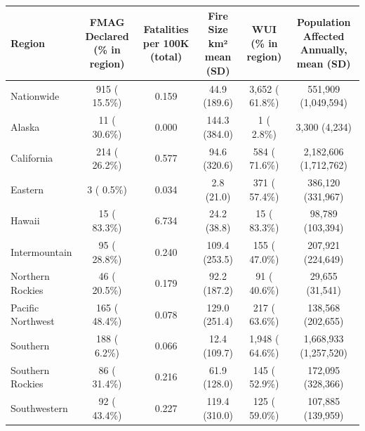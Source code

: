 \begin{table}
\fontsize{6.0pt}{7.2pt}\selectfont
\begin{tabular*}{\linewidth}{@{\extracolsep{\fill}}lccccc}
\toprule
Region & FMAG Declared (\% in region) & Fatalities per 100K
(total) & Fire Size km²
mean (SD) & WUI
(\% in region) & Population Affected Annually, mean (SD) \\ 
\midrule\addlinespace[2.5pt]
Nationwide &   915 ( 15.5\%) &    0.159 & 44.9 (189.6) & 3,652 ( 61.8\%) & 551,909 (1,049,594) \\ 
Alaska &    11 ( 30.6\%) &    0.000 & 144.3 (384.0) &     1 (  2.8\%) & 3,300 (4,234) \\ 
California &   214 ( 26.2\%) &    0.577 & 94.6 (320.6) &   584 ( 71.6\%) & 2,182,606 (1,712,762) \\ 
Eastern &     3 (  0.5\%) &    0.034 & 2.8 (21.0) &   371 ( 57.4\%) & 386,120 (331,967) \\ 
Hawaii &    15 ( 83.3\%) &    6.734 & 24.2 (38.8) &    15 ( 83.3\%) & 98,789 (103,394) \\ 
Intermountain &    95 ( 28.8\%) &    0.240 & 109.4 (253.5) &   155 ( 47.0\%) & 207,921 (224,649) \\ 
Northern Rockies &    46 ( 20.5\%) &    0.179 & 92.2 (187.2) &    91 ( 40.6\%) & 29,655 (31,541) \\ 
Pacific Northwest &   165 ( 48.4\%) &    0.078 & 129.0 (251.4) &   217 ( 63.6\%) & 138,568 (202,655) \\ 
Southern &   188 (  6.2\%) &    0.066 & 12.4 (109.7) & 1,948 ( 64.6\%) & 1,668,933 (1,257,520) \\ 
Southern Rockies &    86 ( 31.4\%) &    0.216 & 61.9 (128.0) &   145 ( 52.9\%) & 172,095 (328,366) \\ 
Southwestern &    92 ( 43.4\%) &    0.227 & 119.4 (310.0) &   125 ( 59.0\%) & 107,885 (139,959) \\ 
\bottomrule
\end{tabular*}
\end{table}

